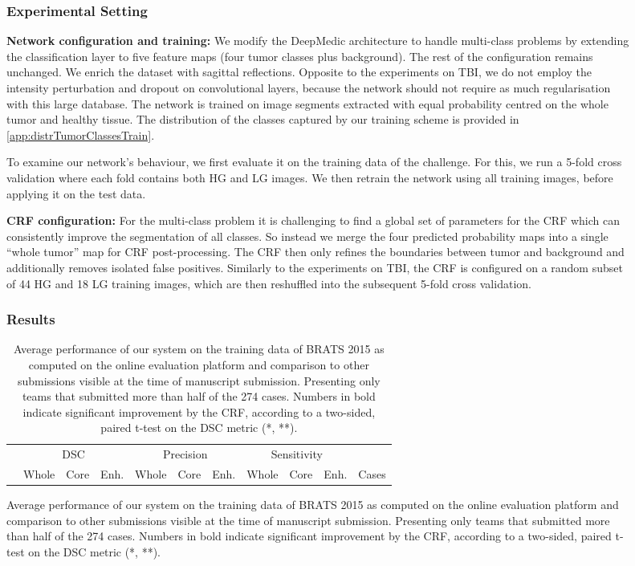 \documentclass[preprint,authoryear,12pt]{elsarticle}
\newcommand{\quot}[1]{``#1''}
\begin{document}
\begin{figure}[h]
\subsubsection{Experimental Setting}

\textbf{Network configuration and training:} We modify the DeepMedic architecture to handle multi-class problems by extending the classification layer to five feature maps (four tumor classes plus background). The rest of the configuration remains unchanged. We enrich the dataset with sagittal reflections. Opposite to the experiments on TBI, we do not employ the intensity perturbation and dropout on convolutional layers, because the network should not require as much regularisation with this large database. The network is trained on image segments extracted with equal probability centred on the whole tumor and healthy tissue. The distribution of the classes captured by our training scheme is provided in \ref{app:distrTumorClassesTrain}.

To examine our network's behaviour, we first evaluate it on the training data of the challenge. For this, we run a 5-fold cross validation where each fold contains both HG and LG images. We then retrain the network using all training images, before applying it on the test data.

\textbf{CRF configuration:} For the multi-class problem it is challenging to find a global set of parameters for the CRF which can consistently improve the segmentation of all classes. So instead we merge the four predicted probability maps into a single \quot{whole tumor} map for CRF post-processing. The CRF then only refines the boundaries between tumor and background and additionally removes isolated false positives. Similarly to the experiments on TBI, the CRF is configured on a random subset of 44 HG and 18 LG training images, which are then reshuffled into the subsequent 5-fold cross validation. 

\subsubsection{Results}
\label{subsubsec:resBrats2015}



\begin{table}[!h]
\centering
\scriptsize
\caption{Average performance of our system on the training data of BRATS 2015 as computed on the online evaluation platform and comparison to other submissions visible at the time of manuscript submission. Presenting only teams that submitted more than half of the 274 cases. Numbers in bold indicate significant improvement by the CRF, according to a two-sided, paired t-test on the DSC metric (*, **). }
\label{table:onlineEvalBrats2015Training}
\begin{tabular}{@{}lllllllllll@{}}
\toprule
              & \multicolumn{3}{c}{DSC}  & \multicolumn{3}{c}{Precision} & \multicolumn{3}{c}{Sensitivity} &       \\ \cmidrule(lr){2-10}
              	& Whole & Core 	& Enh. 		& Whole   & Core  	& Enh.  & Whole & Core & Enh.   	& Cases \\ \midrule
              

\end{tabular}
\end{table}
\end{figure}
\end{document}
